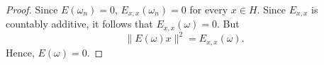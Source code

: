 \begin{proof}
  Since \( E(\omega_n) = 0 \), \( E_{x,x}(\omega_n) = 0 \) for every \( x \in H \). Since \( E_{x,x} \) is countably additive, it follows that \( E_{x,x}(\omega) = 0 \). But
  \[
    \|E(\omega)x\|^2 = E_{x,x}(\omega).
  \]
  Hence, \( E(\omega) = 0 \).
\end{proof}











